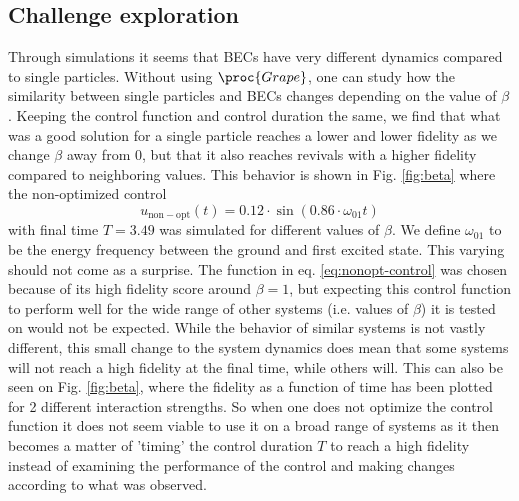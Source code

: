 \documentclass[a4paper, twocolumn]{revtex4-1}
\begin{document}
\subsection{Challenge exploration}\label{subsec:challenge_expl}
Through simulations it seems that BECs have very different dynamics compared to single particles. Without using $\proc{Grape}$, one can study how the similarity between single particles and BECs changes depending on the value of $\beta$. Keeping the control function and control duration the same, we find that what was a good solution for a single particle reaches a lower and lower fidelity as we change $\beta$ away from 0, but that it also reaches revivals with a higher fidelity compared to neighboring values. This behavior is shown in Fig. \ref{fig:beta} where the non-optimized control
\begin{equation}
	u_{\mathrm{non-opt}}(t)=0.12\cdot\sin(0.86\cdot \omega_{01} t)
	\label{eq:nonopt-control}
\end{equation} with final time $T=3.49$ was simulated for different values of $\beta$. We define $\omega_{01}$ to be the energy frequency between the ground and first excited state. This varying should not come as a surprise. The function in eq. \eqref{eq:nonopt-control} was chosen because of its high fidelity score around $\beta=1$, but expecting this control function to perform well for the wide range of other systems (i.e. values of $\beta$) it is tested on would not be expected. While the behavior of similar systems is not vastly different, this small change to the system dynamics does mean that some systems will not reach a high fidelity at the final time, while others will. This can also be seen on Fig. \ref{fig:beta}, where the fidelity as a function of time has been plotted for 2 different interaction strengths. So when one does not optimize the control function it does not seem viable to use it on a broad range of systems as it then becomes a matter of 'timing' the control duration $T$ to reach a high fidelity instead of examining the performance of the control and making changes according to what was observed.
\end{document}

